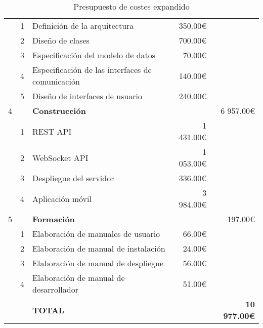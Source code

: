 \begin{table}[H]
{\begin{tabular}{ l l l r r }
        & 1 & Definición de la arquitectura                     & 350.00€   & \\
        & 2 & Diseño de clases                                  & 700.00€   & \\
        & 3 & Especificación del modelo de datos                & 70.00€    & \\
        & 4 & Especificación de las interfaces de comunicación  & 140.00€   & \\
        & 5 & Diseño de interfaces de usuario                   & 240.00€   & \\
        4 & & \textbf{Construcción}                             &           & 6 957.00€ \\
        & 1 & REST API                                          & 1 431.00€ & \\
        & 2 & WebSocket API                                     & 1 053.00€ & \\
        & 3 & Despliegue del servidor                           & 336.00€   & \\
        & 4 & Aplicación móvil                                  & 3 984.00€ & \\
        5 & & \textbf{Formación}                                &           & 197.00€ \\
        & 1 & Elaboración de manuales de usuario                & 66.00€    & \\
        & 2 & Elaboración de manual de instalación              & 24.00€    & \\
        & 3 & Elaboración de manual de despliegue               & 56.00€    & \\
        & 4 & Elaboración de manual de desarrollador            & 51.00€    & \\
        \hline
        &   & \textbf{TOTAL}                                    &           & \textbf{10 977.00€} \\
        \hline
    \end{tabular}}
    \caption{Presupuesto de costes expandido}
    \label{pre:costes_expandido}
\end{table}

